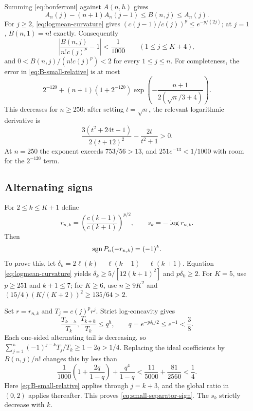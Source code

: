 Summing \eqref{eq:bonferroni} against $A(n,h)$ gives
\begin{equation}\label{eq:B-small}
A_n(j)-(n+1)A_n(j-1)\le B(n,j)\le A_n(j).
\end{equation}
For $j\ge2$, \eqref{eq:logmean-curvature} gives
$(c(j-1)/c(j))^p\le e^{-p/(2j)}$; at $j=1$, $B(n,1)=n!$ exactly. Consequently
\begin{equation}\label{eq:B-small-relative}
\left|\frac{B(n,j)}{n!c(j)^p}-1\right|<\frac1{1000}
\qquad(1\le j\le K+4),
\end{equation}
and $0<B(n,j)/(n!c(j)^p)<2$ for every $1\le j\le n$.
For completeness, the error in \eqref{eq:B-small-relative} is at most
\[
2^{-120}+(n+1)(1+2^{-120})
\exp\left(-\frac{n+1}{2(\sqrt n/3+4)}\right).
\]
This decreases for $n\ge250$: after setting $t=\sqrt n$, the relevant logarithmic derivative is
\[
\frac{3(t^2+24t-1)}{2(t+12)^2}-\frac{2t}{t^2+1}>0.
\]
At $n=250$ the exponent exceeds $753/56>13$, and $251e^{-13}<1/1000$ with room for the $2^{-120}$ term.

\subsection{Alternating signs}
For $2\le k\le K+1$ define
\[
r_{n,k}=\left(\frac{c(k-1)}{c(k+1)}\right)^{p/2},
\qquad s_k=-\log r_{n,k}.
\]
Then
\begin{equation}\label{eq:small-separator-sign}
\operatorname{sgn} P_n(-r_{n,k})=(-1)^k.
\end{equation}
To prove this, let $\delta_k=2\ell(k)-\ell(k-1)-\ell(k+1)$.
Equation \eqref{eq:logmean-curvature} yields
$\delta_k\ge5/[12(k+1)^2]$ and $p\delta_k\ge2$.
For $K=5$, use $p\ge251$ and $k+1\le7$; for $K\ge6$, use
$n\ge9K^2$ and $(15/4)(K/(K+2))^2\ge135/64>2$.

Set $r=r_{n,k}$ and $T_j=c(j)^p r^j$. Strict log-concavity gives
\[
\frac{T_{k-h}}{T_k},\frac{T_{k+h}}{T_k}\le q^h,\qquad
q=e^{-p\delta_k/2}\le e^{-1}<\frac38.
\]
Each one-sided alternating tail is decreasing, so
$\sum_{j=1}^n(-1)^{j-k}T_j/T_k\ge1-2q>1/4$.
Replacing the ideal coefficients by $B(n,j)/n!$ changes this by less than
\[
\frac1{1000}\left(1+\frac{2q}{1-q}\right)
+\frac{q^4}{1-q}
<\frac{11}{5000}+\frac{81}{2560}<\frac14.
\]
Here \eqref{eq:B-small-relative} applies through $j=k+3$, and the global ratio in $(0,2)$ applies thereafter. This proves \eqref{eq:small-separator-sign}. The $s_k$ strictly decrease with $k$.


